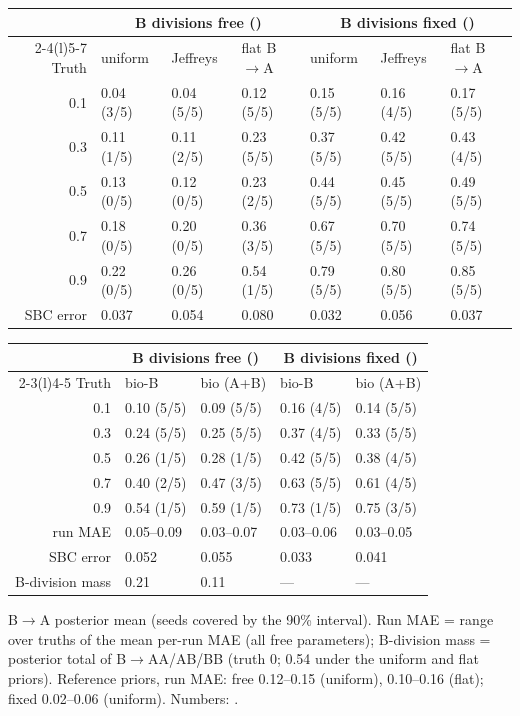 \documentclass[10pt,a4paper]{article}
\newcommand{\res}[1]{\texttt{\detokenize{#1}}}  %
\newcommand{\code}[1]{\texttt{\detokenize{#1}}}
\begin{document}
\begin{center}\footnotesize
\begin{tabular}{@{}rllllll@{}}\toprule
 & \multicolumn{3}{c}{B divisions free (\code{two_type})} & \multicolumn{3}{c}{B divisions fixed (\code{reversible_ab})} \\\cmidrule(lr){2-4}\cmidrule(l){5-7}
Truth & uniform & Jeffreys & flat B$\to$A & uniform & Jeffreys & flat B$\to$A \\\midrule
0.1 & 0.04 (3/5) & 0.04 (5/5) & 0.12 (5/5) & 0.15 (5/5) & 0.16 (4/5) & 0.17 (5/5) \\
0.3 & 0.11 (1/5) & 0.11 (2/5) & 0.23 (5/5) & 0.37 (5/5) & 0.42 (5/5) & 0.43 (4/5) \\
0.5 & 0.13 (0/5) & 0.12 (0/5) & 0.23 (2/5) & 0.44 (5/5) & 0.45 (5/5) & 0.49 (5/5) \\
0.7 & 0.18 (0/5) & 0.20 (0/5) & 0.36 (3/5) & 0.67 (5/5) & 0.70 (5/5) & 0.74 (5/5) \\
0.9 & 0.22 (0/5) & 0.26 (0/5) & 0.54 (1/5) & 0.79 (5/5) & 0.80 (5/5) & 0.85 (5/5) \\\midrule
SBC error & 0.037 & 0.054 & 0.080 & 0.032 & 0.056 & 0.037 \\\bottomrule
\end{tabular}

\medskip
\begin{tabular}{@{}rllll@{}}\toprule
 & \multicolumn{2}{c}{B divisions free (\code{two_type})} & \multicolumn{2}{c}{B divisions fixed (\code{reversible_ab})} \\\cmidrule(lr){2-3}\cmidrule(l){4-5}
Truth & bio-B & bio (A+B) & bio-B & bio (A+B) \\\midrule
0.1 & 0.10 (5/5) & 0.09 (5/5) & 0.16 (4/5) & 0.14 (5/5) \\
0.3 & 0.24 (5/5) & 0.25 (5/5) & 0.37 (4/5) & 0.33 (5/5) \\
0.5 & 0.26 (1/5) & 0.28 (1/5) & 0.42 (5/5) & 0.38 (4/5) \\
0.7 & 0.40 (2/5) & 0.47 (3/5) & 0.63 (5/5) & 0.61 (4/5) \\
0.9 & 0.54 (1/5) & 0.59 (1/5) & 0.73 (1/5) & 0.75 (3/5) \\\midrule
run MAE & 0.05--0.09 & 0.03--0.07 & 0.03--0.06 & 0.03--0.05 \\
SBC error & 0.052 & 0.055 & 0.033 & 0.041 \\
B-division mass & 0.21 & 0.11 & --- & --- \\\bottomrule
\end{tabular}

B$\to$A posterior mean (seeds covered by the 90\% interval). Run MAE = range over truths of the mean per-run MAE (all free parameters); B-division mass = posterior total of B$\to$AA/AB/BB (truth 0; 0.54 under the uniform and flat priors). Reference priors, run MAE: free 0.12--0.15 (uniform), 0.10--0.16 (flat); fixed 0.02--0.06 (uniform). Numbers: \res{tables/x5a.csv}.
\end{center}
\end{document}
